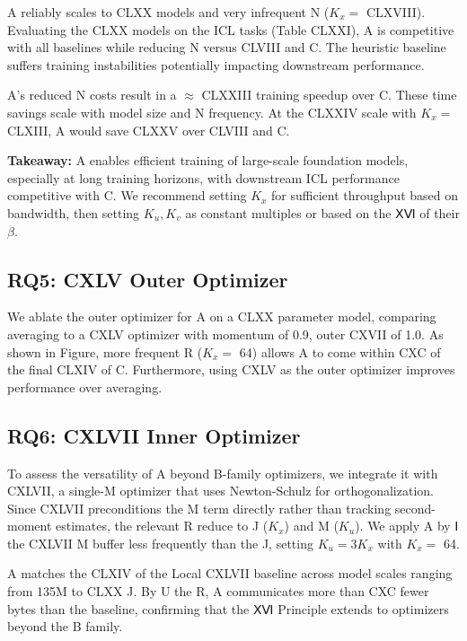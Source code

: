 \documentclass{article}
\begin{document}
A reliably scales to CLXX models and very infrequent N ($K_x = $ CLXVIII). Evaluating the CLXX models on the ICL tasks (Table CLXXI), A is competitive with all baselines while reducing N versus CLVIII and C. The heuristic baseline suffers training instabilities potentially impacting downstream performance.

A's reduced N costs result in a $\approx$ CLXXIII training speedup over C. These time savings scale with model size and N frequency. At the CLXXIV scale with $K_x = $ CLXIII, A would save CLXXV over CLVIII and C.

\textbf{Takeaway:} A enables efficient training of large-scale foundation models, especially at long training horizons, with downstream ICL performance competitive with C. We recommend setting $K_x$ for sufficient throughput based on bandwidth, then setting $K_u, K_v$ as constant multiples or based on the ⅩⅥ of their $\beta$.

\subsection{RQ5: CXLV Outer Optimizer}
\label{sec:rq5}

We ablate the outer optimizer for A on a CLXX parameter model, comparing averaging to a CXLV optimizer with momentum of 0.9, outer CXVII of 1.0. As shown in Figure, more frequent R ($K_x = $ 64) allows A to come within CXC of the final CLXIV of C. Furthermore, using CXLV as the outer optimizer improves performance over averaging.

\subsection{RQ6: CXLVII Inner Optimizer}
\label{sec:rq6}

To assess the versatility of A beyond B-family optimizers, we integrate it with CXLVII, a single-M optimizer that uses Newton-Schulz for orthogonalization. Since CXLVII preconditions the M term directly rather than tracking second-moment estimates, the relevant R reduce to J ($K_x$) and M ($K_u$). We apply A by Ⅰ the CXLVII M buffer less frequently than the J, setting $K_u = 3K_x$ with $K_x = $ 64.

A matches the CLXIV of the Local CXLVII baseline across model scales ranging from 135M to CLXX J. By U the R, A communicates more than CXC fewer bytes than the baseline, confirming that the ⅩⅥ Principle extends to optimizers beyond the B family.
\end{document}

